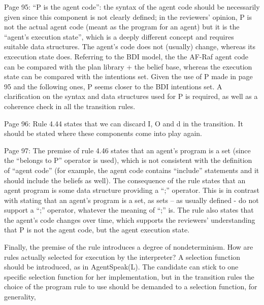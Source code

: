 \documentclass{article}
\newcommand{\todo}[1]{[\textcolor{red}{TODO}: #1]}
\newenvironment{them}{\noindent\begingroup\color{blue}}{\endgroup\par}
\begin{document}
\begin{them}

Page 95:
“P is the agent code”: the syntax of the agent code should be necessarily given since this component
is not clearly defined; in the reviewers' opinion, P is not the actual agent code (meant as the program
for an agent) but it is the “agent's execution state”, which is a deeply different concept and requires
suitable data structures. The agent's code does not (usually) change, whereas its excecution state
does. Referring to the BDI model, the the AF-Raf agent code can be compared with the plan library +
the belief base, whereas the execution state can be compared with the intentions set. Given the use
of P made in page 95 and the following ones, P seems closer to the BDI intentions set. A clarification
on the syntax and data structures used for P is required, as well as a coherence check in all the
transition rules.
\end{them}
\todo{}

\begin{them}

Page 96:
Rule 4.44 states that we can discard I, O and d in the transition. It should be stated where these
components come into play again.
\end{them}
\todo{}

\begin{them}

Page 97:
The premise of rule 4.46 states that an agent's program is a set (since the “belongs to P” operator is
used), which is not consistent with the definition of “agent code” (for example, the agent code
contains “include” statements and it should include the beliefs as well). The consequence of the rule
states that an agent program is some data structure providing a “;” operator. This is in contrast with
stating that an agent's program is a set, as sets – as usually defined - do not support a “;” operator,
whatever the meaning of “;” is. The rule also states that the agent's code changes over time, which
supports the reviewers' understanding that P is not the agent code, but the agent execution state.
\end{them}
\todo{}

\begin{them}

Finally, the premise of the rule introduces a degree of nondeterminism. How are rules actually
selected for execution by the interpreter? A selection function should be introduced, as in
AgentSpeak(L). The candidate can stick to one specific selection function for her implementation, but
in the transition rules the choice of the program rule to use should be demanded to a selection
function, for generality,
\end{them}
\todo{}
\end{document}
